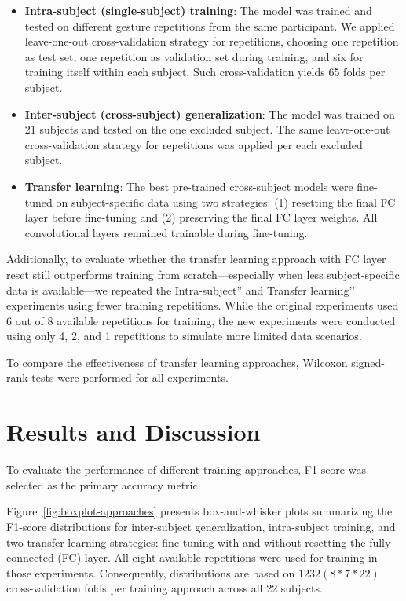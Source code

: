 \begin{itemize}
    \item \textbf{Intra-subject (single-subject) training}: The model was trained and tested on different gesture repetitions from the same participant. We applied leave-one-out cross-validation strategy for repetitions, choosing one repetition as test set, one repetition as validation set during training, and six for training itself within each subject. Such cross-validation yields 65 folds per subject.
    \item \textbf{Inter-subject (cross-subject) generalization}: The model was trained on 21 subjects and tested on the one excluded subject. The same leave-one-out cross-validation strategy for repetitions was applied per each excluded subject.
    \item \textbf{Transfer learning}: The best pre-trained cross-subject models were fine-tuned on subject-specific data using two strategies: (1) resetting the final FC layer before fine-tuning and (2) preserving the final FC layer weights. All convolutional layers remained trainable during fine-tuning.
\end{itemize}

Additionally, to evaluate whether the transfer learning approach with FC layer reset still outperforms training from scratch—especially when less subject-specific data is available—we repeated the Intra-subject'' and Transfer learning’’ experiments using fewer training repetitions. While the original experiments used 6 out of 8 available repetitions for training, the new experiments were conducted using only 4, 2, and 1 repetitions to simulate more limited data scenarios.

To compare the effectiveness of transfer learning approaches, Wilcoxon signed-rank tests were performed for all experiments.

\section{Results and Discussion}

To evaluate the performance of different training approaches, F1-score was selected as the primary accuracy metric.

Figure~\ref{fig:boxplot-approaches} presents box-and-whisker plots summarizing the F1-score distributions for inter-subject generalization, intra-subject training, and two transfer learning strategies: fine-tuning with and without resetting the fully connected (FC) layer. All eight available repetitions were used for training in those experiments. Consequently, distributions are based on $1232 (8*7*22)$ cross-validation folds per training approach across all 22 subjects.

